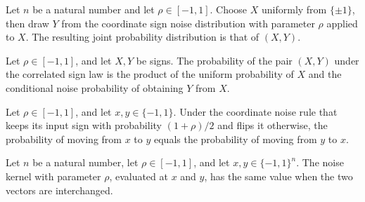 \begin{definition}
\label{FABL.correlatedSignPairPMF}
\leanok
{}
Let $n$ be a natural number and let $\rho\in[-1,1]$. Choose $X$ uniformly from
$\{\pm1\}$, then draw $Y$ from the coordinate sign noise distribution with parameter
$\rho$ applied to $X$. The resulting joint probability distribution is that of $(X,Y)$.
\end{definition}

\begin{theorem}
\label{FABL.correlatedSignPairPMF_apply}
\leanok
{}
Let $\rho\in[-1,1]$, and let $X,Y$ be signs. The probability of the pair $(X,Y)$ under
the correlated sign law is the product of the uniform probability of $X$ and the
conditional noise probability of obtaining $Y$ from $X$.
\end{theorem}

\begin{theorem}
\label{FABL.coordinateNoisePMF_apply_comm}
\leanok
{}
Let $\rho\in[-1,1]$, and let $x,y\in\{−1,1\}$. Under the coordinate noise rule that
keeps its input sign with probability $(1+\rho)/2$ and flips it otherwise, the
probability of moving from $x$ to $y$ equals the probability of moving from $y$ to $x$.
\end{theorem}

\begin{theorem}
\label{FABL.noiseKernel_apply_comm}
\leanok
{}
Let $n$ be a natural number, let $\rho\in[-1,1]$, and let $x,y\in\{-1,1\}^n$. The noise
kernel with parameter $\rho$, evaluated at $x$ and $y$, has the same value when the two
vectors are interchanged.
\end{theorem}

